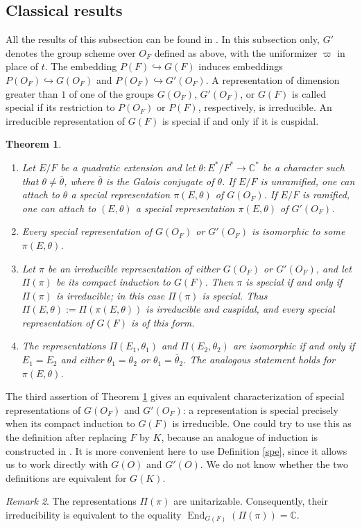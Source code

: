 \documentclass[11pt,a4paper,twoside]{amsart}
\newtheorem{theorem}{Theorem}[section]
\theoremstyle{definition}
\theoremstyle{remark}
\newtheorem{remark}[theorem]{Remark}
\newcommand{\ho}{\hookrightarrow}
\newcommand{\CC}{\mathbb C}
\newcommand{\otheta}{\overline{\theta}}
\newcommand{\End}{\operatorname{End}}
\begin{document}
\subsection{Classical results}\label{classical}
All the results of this subsection can be found in \cite{BH}. In this subsection only, $G'$ denotes the group scheme over $O_F$ defined as above, with the uniformizer $\varpi$ in place of $t$.
The embedding $P(F)\ho G(F)$ induces embeddings $P(O_F)\ho G(O_F)$ and $P(O_F)\ho G'(O_F)$. A representation of dimension greater than $1$ of one of the groups $G(O_F)$, $G'(O_F)$, or $G(F)$ is called special if its restriction to $P(O_F)$ or $P(F)$, respectively, is irreducible. An irreducible representation of $G(F)$ is special if and only if it is cuspidal.
\begin{theorem}\label{classical-theorem}
\begin{enumerate}
\item Let $E/F$ be a quadratic extension and let $\theta:E^*/F^*\to\CC^*$ be a character such that $\theta\neq\otheta$, where $\otheta$ is the Galois conjugate of $\theta$. If $E/F$ is unramified, one can attach to $\theta$ a special representation $\pi(E,\theta)$ of $G(O_F)$. If $E/F$ is ramified, one can attach to $(E,\theta)$ a special representation $\pi(E,\theta)$ of $G'(O_F)$.
\item Every special representation of $G(O_F)$ or $G'(O_F)$ is isomorphic to some $\pi(E,\theta)$.
\item Let $\pi$ be an irreducible representation of either $G(O_F)$ or $G'(O_F)$, and let $\Pi(\pi)$ be its compact induction to $G(F)$. Then $\pi$ is special if and only if $\Pi(\pi)$ is irreducible; in this case $\Pi(\pi)$ is special. Thus $\Pi(E,\theta):=\Pi(\pi(E,\theta))$ is irreducible and cuspidal, and every special representation of $G(F)$ is of this form.
\item The representations $\Pi(E_1,\theta_1)$ and $\Pi(E_2,\theta_2)$ are isomorphic if and only if $E_1=E_2$ and either $\theta_1=\theta_2$ or $\theta_1=\otheta_2$. The analogous statement holds for $\pi(E,\theta)$.
\end{enumerate}
\end{theorem}
The third assertion of Theorem \ref{classical-theorem} gives an equivalent characterization of special representations of $G(O_F)$ and $G'(O_F)$: a representation is special precisely when its compact induction to $G(F)$ is irreducible. One could try to use this as the definition after replacing $F$ by $K$, because an analogue of induction is constructed in \cite{GK}. It is more convenient here to use Definition \ref{spe}, since it allows us to work directly with $G(O)$ and $G'(O)$. We do not know whether the two definitions are equivalent for $G(K)$.
\begin{remark}
The representations $\Pi(\pi)$ are unitarizable. Consequently, their irreducibility is equivalent to the equality $\End_{G(F)}(\Pi(\pi))=\CC$.
\end{remark}
\end{document}
